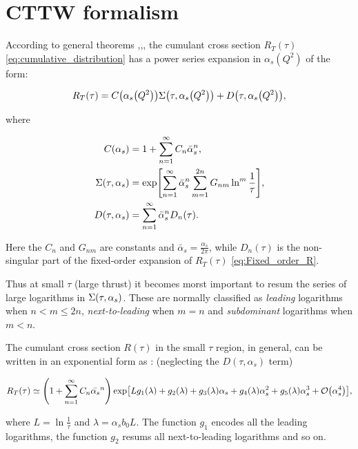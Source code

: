 \documentclass[../Tesi_Jiahao_Miao_986136.tex]{subfiles}
\begin{document}
\section{CTTW formalism}\label{sec:CTTW convention}

According to general theorems \cite{Block:1937},\cite{Kinoshita:1962ur},\cite{Lee:1964is}, 
the cumulant cross section $R_T(\tau)$ \cref{eq:cumulative_distribution} has a power series expansion in $\alpha_s(Q^2)$ of the form:

\begin{equation}\label{eq:cumulant_expansion}
    R_T(\tau) =  C\qty(\alpha_s\qty(Q^2))\Sigma\qty(\tau,\alpha_s\qty(Q^2)) + D\qty(\tau,\alpha_s\qty(Q^2)),
\end{equation}

where 

\begin{align}
    C\qty(\alpha_s) &= 1 + \sum_{n=1}^{\infty} C_n \bar{\alpha}_s^n , \\
    \Sigma\qty(\tau,\alpha_s)&= \exp[\sum_{n=1}^\infty \bar{\alpha}_s^n \sum_{m=1}^{2n}G_{nm}\ln^m \frac{1}{\tau}] \label{eq:sigma} ,\\
    D(\tau,\alpha_s) &= \sum_{n=1}^{\infty} \bar{\alpha}_s^n D_n(\tau).
\end{align}

Here the $C_n$ and $G_{nm}$ are constants and $\bar{\alpha}_s = \frac{\alpha_s}{2\pi}$, while $D_n(\tau)$ 
is the non-singular part of the fixed-order expansion of $R_T(\tau)$ \cref{eq:Fixed_order_R}.

Thus at small $\tau$ (large thrust) it becomes morst important to resum the series of large logarithms in $\Sigma\qty(\tau,\alpha_s)$.
These are normally classified as \emph{leading} logarithms when $n < m \le 2n$, \emph{next-to-leading} when $m = n$ 
and \emph{subdominant} logarithms when $m < n$. 

The cumulant cross section $R(\tau)$ in the small $\tau$ region, in general, can be written in an exponential form as : (neglecting the $D(\tau,\alpha_s)$ term)

\begin{equation}\label{eq:resummed_R}
    R_T(\tau) \simeq \qty(1 + \sum_{n=1}^{\infty} C_n \bar{\alpha_s}^n)\exp[L g_1(\lambda)  + g_2(\lambda) + g_3(\lambda) \alpha_s + g_4(\lambda) \alpha_s^2 + g_5(\lambda) \alpha_s^3 + \order{\alpha_s^4}],
\end{equation}

where $L = \ln \frac{1}{\tau}$ and $\lambda = \alpha_s b_0 L$. The function $g_1$ encodes all the leading logarithms, the function $g_2$
resums all next-to-leading logarithms and so on.
\end{document}
